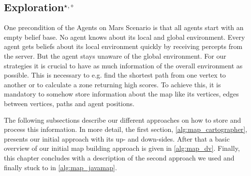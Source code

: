 \subsection[Exploration]{Exploration$^{\star,\circ}$}\label{alg:exploration} %
One precondition of the Agents on Mars Scenario is that all agents start with an empty belief base.
No agent knows about its local and global environment.
Every agent gets beliefs about its local environment quickly by receiving percepts from the server. %
But the agent stays unaware of the global environment.
For our strategies it is crucial to have as much information of the overall environment as possible.
This is necessary to e.g. find the shortest path from one vertex to another or to calculate a zone returning high scores.
To achieve this, it is mandatory to somehow store information about the map like its vertices, edges between vertices, paths and agent positions.

The following subsections describe our different approaches on how to store and process this information.
In more detail, the first section, \autoref{alg:map_cartographer}, presents our initial approach with its up- and down-sides.
After that a basic overview of our initial map building approach is given in \autoref{alg:map_dv}.
Finally, this chapter concludes with a description of the second approach we used and finally stuck to in \autoref{alg:map_javamap}. %

